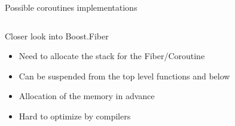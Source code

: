\documentclass[10pt]{beamer}
\begin{document}
\begin{frame}{Possible coroutines implementations}
\begin{columns}[t]
\end{columns}

\end{frame}

\begin{frame}{Closer look into Boost.Fiber}
  \begin{itemize}[<+- |alert@+>]
  \item Need to allocate the stack for the Fiber/Coroutine
  \item Can be suspended from the top level functions and below
  \item Allocation of the memory in advance
  \item Hard to optimize by compilers
  \end{itemize}
\end{frame}
\end{document}

